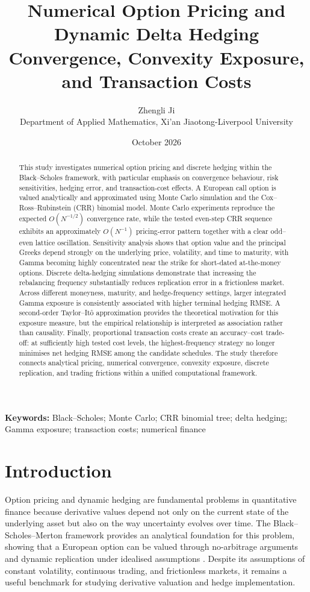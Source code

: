 \documentclass[11pt,a4paper]{article}
\title{\textbf{\Large Numerical Option Pricing and Dynamic Delta Hedging}\\[0.4em]
\large Convergence, Convexity Exposure, and Transaction Costs}
\author{Zhengli Ji\\
Department of Applied Mathematics, Xi'an Jiaotong-Liverpool University}
\date{October 2026}
\begin{document}


\maketitle

\begin{abstract}
This study investigates numerical option pricing and discrete hedging within the Black--Scholes framework, with particular emphasis on convergence behaviour, risk sensitivities, hedging error, and transaction-cost effects. A European call option is valued analytically and approximated using Monte Carlo simulation and the Cox--Ross--Rubinstein (CRR) binomial model. Monte Carlo experiments reproduce the expected $O(N^{-1/2})$ convergence rate, while the tested even-step CRR sequence exhibits an approximately $O(N^{-1})$ pricing-error pattern together with a clear odd--even lattice oscillation. Sensitivity analysis shows that option value and the principal Greeks depend strongly on the underlying price, volatility, and time to maturity, with Gamma becoming highly concentrated near the strike for short-dated at-the-money options. Discrete delta-hedging simulations demonstrate that increasing the rebalancing frequency substantially reduces replication error in a frictionless market. Across different moneyness, maturity, and hedge-frequency settings, larger integrated Gamma exposure is consistently associated with higher terminal hedging RMSE. A second-order Taylor--It\^o approximation provides the theoretical motivation for this exposure measure, but the empirical relationship is interpreted as association rather than causality. Finally, proportional transaction costs create an accuracy--cost trade-off: at sufficiently high tested cost levels, the highest-frequency strategy no longer minimises net hedging RMSE among the candidate schedules. The study therefore connects analytical pricing, numerical convergence, convexity exposure, discrete replication, and trading frictions within a unified computational framework.
\end{abstract}

\noindent\textbf{Keywords:} Black--Scholes; Monte Carlo; CRR binomial tree; delta hedging; Gamma exposure; transaction costs; numerical finance

\section{Introduction}

Option pricing and dynamic hedging are fundamental problems in quantitative finance because derivative values depend not only on the current state of the underlying asset but also on the way uncertainty evolves over time. The Black--Scholes--Merton framework provides an analytical foundation for this problem, showing that a European option can be valued through no-arbitrage arguments and dynamic replication under idealised assumptions \citep{blackscholes1973,merton1973}. Despite its assumptions of constant volatility, continuous trading, and frictionless markets, it remains a useful benchmark for studying derivative valuation and hedge implementation.
\end{document}
